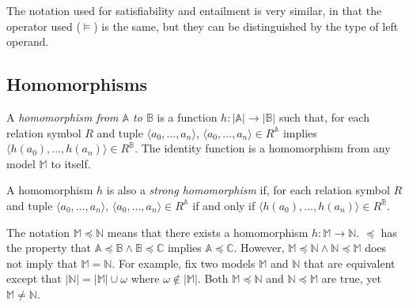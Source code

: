 		The notation used for satisfiability and entailment is very similar, in
		that the operator used ($\models$) is the same, but they can be
		distinguished by the type of left operand.

	\subsection{Homomorphisms}

		A \emph{homomorphism from $\mathbb{A}$ to $\mathbb{B}$} is a function
		$h: |\mathbb{A}|\to|\mathbb{B}|$ such that, for each relation symbol
		$R$ and tuple $\langle a_0 , \ldots , a_n \rangle$, $\langle a_0 ,
		\ldots , a_n  \rangle \in R^\mathbb{A}$ implies $\langle h(a_0) ,
		\ldots , h(a_n) \rangle \in R^\mathbb{B}$. The identity function is a
		homomorphism from any model $\mathbb{M}$ to itself.


		A homomorphism $h$ is also a \emph{strong homomorphism} if, for each
		relation symbol $R$ and tuple $\langle a_0 , \ldots , a_n \rangle$,
		$\langle a_0 , \ldots , a_n  \rangle \in R^\mathbb{A}$ if and only if
		$\langle h(a_0) , \ldots , h(a_n) \rangle \in R^\mathbb{B}$.

		The notation $\mathbb{M} \preceq \mathbb{N}$ means that there exists a
		homomorphism $h : \mathbb{M} \to \mathbb{N}$. $\preceq$ has the
		property that $\mathbb{A} \preceq \mathbb{B} \wedge \mathbb{B} \preceq
		\mathbb{C}$ implies $\mathbb{A} \preceq \mathbb{C}$. However,
		$\mathbb{M} \preceq \mathbb{N} \wedge \mathbb{N} \preceq \mathbb{M}$
		does not imply that $\mathbb{M} = \mathbb{N}$. For example, fix two
		models $\mathbb{M}$ and $\mathbb{N}$ that are equivalent except that
		$|\mathbb{N}| = |\mathbb{M}| \cup \omega$ where $\omega \not\in
		|\mathbb{M}|$. Both $\mathbb{M} \preceq \mathbb{N}$ and $\mathbb{N}
		\preceq \mathbb{M}$ are true, yet $\mathbb{M} \neq \mathbb{N}$.

